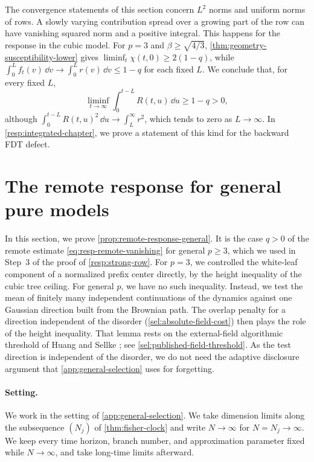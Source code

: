 \begin{remark}\label{rem:resp-l2-versus-l1}
The convergence statements of this section concern $L^2$ norms and uniform norms of rows. A slowly varying contribution spread over a growing part of the row can have vanishing squared norm and a positive integral. This happens for the response in the cubic model. For $p=3$ and $\beta\ge\sqrt{4/3}$, \cref{thm:geometry-susceptibility-lower} gives $\liminf_t\chi(t,0)\ge2(1-q)$, while $\int_0^Lf_t(v)\,\dd v\to\int_0^Lr(v)\,\dd v\le1-q$ for each fixed $L$. We conclude that, for every fixed $L$,
\[
 \liminf_{t\to\infty}\int_0^{t-L}R(t,u)\,\dd u\ge1-q>0,
\]
although $\int_0^{t-L}R(t,u)^2\,\dd u\to\int_L^\infty r^2$, which tends to zero as $L\to\infty$. In \cref{resp:integrated-chapter}, we prove a statement of this kind for the backward FDT defect.
\end{remark}

\section{The remote response for general pure models}
\label{resp:appendix-p}

In this section, we prove \cref{prop:remote-response-general}. It is the case $q>0$ of the remote estimate \eqref{eq:resp-remote-vanishing} for general $p\ge3$, which we used in Step~3 of the proof of \cref{resp:strong-row}. For $p=3$, we controlled the white-leaf component of a normalized prefix center directly, by the height inequality of the cubic tree ceiling. For general $p$, we have no such inequality. Instead, we test the mean of finitely many independent continuations of the dynamics against one Gaussian direction built from the Brownian path. The overlap penalty for a direction independent of the disorder (\cref{sel:absolute-field-cost}) then plays the role of the height inequality. That lemma rests on the external-field algorithmic threshold of Huang and Sellke \cite[arXiv version~2, Theorem~1, p.~4, and Corollary~1.8, p.~8]{hs2023}; see \cref{sel:published-field-threshold}. As the test direction is independent of the disorder, we do not need the adaptive disclosure argument that \cref{app:general-selection} uses for forgetting.

\paragraph{Setting.}
We work in the setting of \cref{app:general-selection}. We take dimension limits along the subsequence $(N_j)$ of \cref{thm:fisher-clock} and write $N\to\infty$ for $N=N_j\to\infty$. We keep every time horizon, branch number, and approximation parameter fixed while $N\to\infty$, and take long-time limits afterward.

